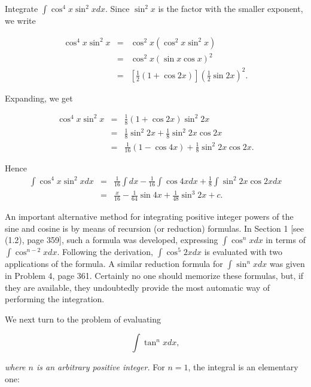 \begin{example}
Integrate $\int \cos^{4}x \sin^{2}x dx$. Since $\sin^{2}x$ is the factor with the smaller exponent, we write

\begin{eqnarray*}
\cos^4x \sin^{2}x &=& \cos^{2}x (\cos^{2}x \sin^{2}x)\\
&=& \cos^{2}x (\sin x \cos x)^2\\
&=& [ \frac{1}{2} ( 1 + \cos 2x)]( \frac{1}{2} \sin 2x)^2.
\end{eqnarray*}

\noindent Expanding, we get 

\begin{eqnarray*}
\cos^{4}x \sin^{2}x &=& \frac{1}{8}(1 + \cos 2x) \sin^{2}2x\\
&=& \frac{1}{8} \sin^{2}2x + \frac{1}{8} \sin^{2}2x \cos2x\\
&=& \frac{1}{16} ( 1 - \cos 4x) + \frac{1}{8} \sin^{2}2x \cos 2x.
\end{eqnarray*}

\noindent Hence
\begin{eqnarray*}
\int \cos^{4}x \sin^{2}x dx &=& \frac{1}{16} \int dx - \frac{1}{16} \int \cos 4x dx 
+ \frac{1}{8} \int \sin^{2}2x \cos 2x dx \\
&=& \frac{x}{16} - \frac{1}{64} \sin 4x + \frac{1}{48} \sin^{3}2x + c.
\end{eqnarray*}
\end{example}

An important alternative method for integrating positive integer powers of the sine and cosine
is by means of recursion (or reduction) formulas. In Section 1 [see (1.2), page 359], such a
formula was developed, expressing $\int \cos^{n}x dx$ in terms of $\int \cos^{n-2}x dx$. 
Following the derivation, $\int \cos^{5} 2x dx$ is evaluated with two applications of the formula.
A similar reduction formula for $\int \sin^{n}x dx$ was given in Problem 4, page 361. 
Certainly no one should memorize these formulas, but, if they are available, they undoubtedly provide the most automatic way of performing the integration.
\medskip

We next turn to the problem of evaluating


\begin{equation}
\int \tan^{n}x dx,  
\label{eq7.2.4}
\end{equation}

\noindent \textit{where $n$ is an arbitrary positive integer.}  For $n = 1$, the integral is an elementary one:

